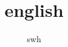 \documentclass[12pt,twiside,a4paper]{ctexbook}
\numberwithin{chapter}{part}
\begin{document}

\author
{
swh
}


\title{english}
\maketitle
\tableofcontents %
\newpage
\pagestyle{fancy}
\end{document}
